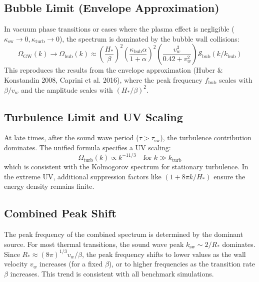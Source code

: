 \documentclass{article}
\begin{document}
\subsection{Bubble Limit (Envelope Approximation)}
In vacuum phase transitions or cases where the plasma effect is negligible ($\kappa_{\text{sw}} \to 0, \kappa_{\text{turb}} \to 0$), the spectrum is dominated by the bubble wall collisions:
\begin{equation}
    \Omega_{\text{GW}}(k) \to \Omega_{\text{bub}}(k) \approx \left( \frac{H_*}{\beta} \right)^2 \left( \frac{\kappa_{\text{bub}} \alpha}{1 + \alpha} \right)^2 \left( \frac{v_w^3}{0.42 + v_w^2} \right) \mathcal{S}_{\text{bub}}(k/k_{\text{bub}})
\end{equation}
This reproduces the results from the envelope approximation (Huber \& Konstandin 2008, Caprini et al. 2016), where the peak frequency $f_{\text{bub}}$ scales with $\beta/v_w$ and the amplitude scales with $(H_*/\beta)^2$.

\subsection{Turbulence Limit and UV Scaling}
At late times, after the sound wave period ($\tau > \tau_{\text{sw}}$), the turbulence contribution dominates. The unified formula specifies a UV scaling:
\begin{equation}
    \Omega_{\text{turb}}(k) \propto k^{-11/3} \quad \text{for } k \gg k_{\text{turb}}
\end{equation}
which is consistent with the Kolmogorov spectrum for stationary turbulence. In the extreme UV, additional suppression factors like $(1 + 8\pi k / H_*)$ ensure the energy density remains finite.

\subsection{Combined Peak Shift}
The peak frequency of the combined spectrum is determined by the dominant source. For most thermal transitions, the sound wave peak $k_{\text{sw}} \sim 2/R_*$ dominates. Since $R_* \approx (8\pi)^{1/3} v_w / \beta$, the peak frequency shifts to lower values as the wall velocity $v_w$ increases (for a fixed $\beta$), or to higher frequencies as the transition rate $\beta$ increases. This trend is consistent with all benchmark simulations.
\end{document}
